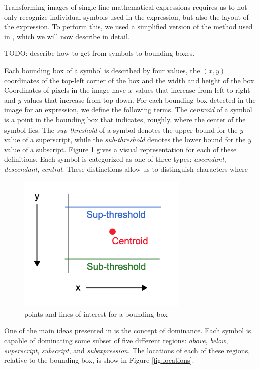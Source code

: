 \documentclass[12pt]{IEEEtran}
\begin{document}
Transforming images of single line mathematical expressions requires us to not only recognize individual symbols used in the expression, but also the layout of the expression. To perform this, we used a simplified version of the method used in \cite{4}, which we will now describe in detail.

TODO: describe how to get from symbols to bounding boxes.

Each bounding box of a symbol is described by four values, the $(x,y)$ coordinates of the top-left corner of the box and the width and height of the box. Coordinates of pixels in the image have $x$ values that increase from left to right and $y$ values that increase from top down.
For each bounding box detected in the image for an expression, we define the following terms. The \textit{centroid} of a symbol is a point in the bounding box that indicates, roughly, where the center of the symbol lies. The \textit{sup-threshold} of a symbol denotes the upper bound for the $y$ value of a superscript, while the \textit{sub-threshold} denotes the lower bound for the $y$ value of a subscript. Figure \ref{fig:values} gives a visual representation for each of these definitions. Each symbol is categorized as one of three types: \textit{ascendant}, \textit{descendant}, \textit{central}. These distinctions allow us to distinguish characters where

\begin{figure}[h]
  \centering
    \includegraphics[width=3.2in]{values.png}
  \caption{points and lines of interest for a bounding box}
  \label{fig:values}
\end{figure}

One of the main ideas presented in \cite{4} is the concept of dominance. Each symbol is capable of dominating some subset of five different regions: \textit{above}, \textit{below}, \textit{superscript}, \textit{subscript}, and \textit{subexpression}. The locations of each of these regions, relative to the bounding box, is show in Figure \ref{fig:locations}.
\end{document}
